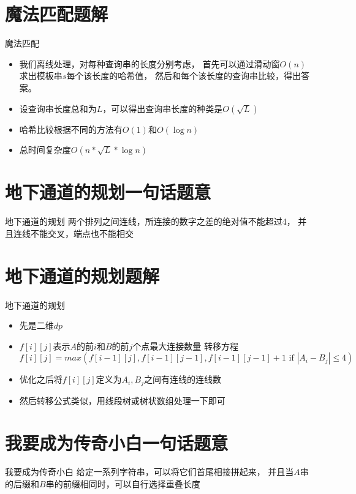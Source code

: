 \documentclass{beamer}
\begin{document}
\section{魔法匹配题解}
\begin{frame} {魔法匹配}
\begin{itemize}
  \item 我们离线处理，对每种查询串的长度分别考虑，
  首先可以通过滑动窗$O(n)$求出模板串$s$每个该长度的哈希值，
  然后和每个该长度的查询串比较，得出答案。
  \item 设查询串长度总和为$L$，可以得出查询串长度的种类是$O(\sqrt{L})$
  \item 哈希比较根据不同的方法有$O(1)$和$O(\log{n})$
  \item 总时间复杂度$O(n*\sqrt{L}*\log{n})$
\end{itemize}
\end{frame}


\section{地下通道的规划一句话题意}
\begin{frame} {地下通道的规划}
  两个排列之间连线，所连接的数字之差的绝对值不能超过4，
  并且连线不能交叉，端点也不能相交
\end{frame}
\section{地下通道的规划题解}
\begin{frame} {地下通道的规划}
\begin{itemize}
  \item 先是二维$dp$
  \item $f[i][j]$表示$A$的前$i$和$B$的前$j$个点最大连接数量
  转移方程
  $$
    f[i][j]=max(
      f[i-1][j],
      f[i-1][j-1],
      f[i-1][j-1]+1\text{ if } |A_i-B_j|\le 4)
  $$
  \item 优化之后将$f[i][j]$定义为$A_i,B_j$之间有连线的连线数
  \item 然后转移公式类似，用线段树或树状数组处理一下即可
\end{itemize}
\end{frame}



\section{我要成为传奇小白一句话题意}
\begin{frame} {我要成为传奇小白}
  给定一系列字符串，可以将它们首尾相接拼起来，
  并且当$A$串的后缀和$B$串的前缀相同时，可以自行选择重叠长度
\end{frame}
\end{document}
